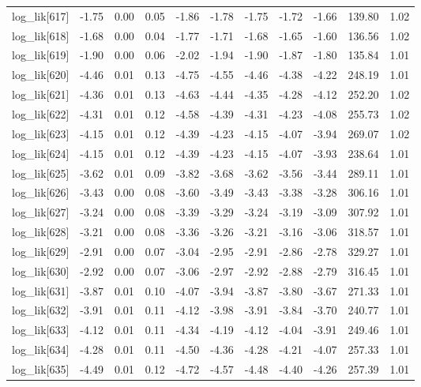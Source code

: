 \begin{table}[ht]
\begin{tabular}{rrrrrrrrrrr}
  log\_lik[617] & -1.75 & 0.00 & 0.05 & -1.86 & -1.78 & -1.75 & -1.72 & -1.66 & 139.80 & 1.02 \\ 
  log\_lik[618] & -1.68 & 0.00 & 0.04 & -1.77 & -1.71 & -1.68 & -1.65 & -1.60 & 136.56 & 1.02 \\ 
  log\_lik[619] & -1.90 & 0.00 & 0.06 & -2.02 & -1.94 & -1.90 & -1.87 & -1.80 & 135.84 & 1.01 \\ 
  log\_lik[620] & -4.46 & 0.01 & 0.13 & -4.75 & -4.55 & -4.46 & -4.38 & -4.22 & 248.19 & 1.01 \\ 
  log\_lik[621] & -4.36 & 0.01 & 0.13 & -4.63 & -4.44 & -4.35 & -4.28 & -4.12 & 252.20 & 1.02 \\ 
  log\_lik[622] & -4.31 & 0.01 & 0.12 & -4.58 & -4.39 & -4.31 & -4.23 & -4.08 & 255.73 & 1.02 \\ 
  log\_lik[623] & -4.15 & 0.01 & 0.12 & -4.39 & -4.23 & -4.15 & -4.07 & -3.94 & 269.07 & 1.02 \\ 
  log\_lik[624] & -4.15 & 0.01 & 0.12 & -4.39 & -4.23 & -4.15 & -4.07 & -3.93 & 238.64 & 1.01 \\ 
  log\_lik[625] & -3.62 & 0.01 & 0.09 & -3.82 & -3.68 & -3.62 & -3.56 & -3.44 & 289.11 & 1.01 \\ 
  log\_lik[626] & -3.43 & 0.00 & 0.08 & -3.60 & -3.49 & -3.43 & -3.38 & -3.28 & 306.16 & 1.01 \\ 
  log\_lik[627] & -3.24 & 0.00 & 0.08 & -3.39 & -3.29 & -3.24 & -3.19 & -3.09 & 307.92 & 1.01 \\ 
  log\_lik[628] & -3.21 & 0.00 & 0.08 & -3.36 & -3.26 & -3.21 & -3.16 & -3.06 & 318.57 & 1.01 \\ 
  log\_lik[629] & -2.91 & 0.00 & 0.07 & -3.04 & -2.95 & -2.91 & -2.86 & -2.78 & 329.27 & 1.01 \\ 
  log\_lik[630] & -2.92 & 0.00 & 0.07 & -3.06 & -2.97 & -2.92 & -2.88 & -2.79 & 316.45 & 1.01 \\ 
  log\_lik[631] & -3.87 & 0.01 & 0.10 & -4.07 & -3.94 & -3.87 & -3.80 & -3.67 & 271.33 & 1.01 \\ 
  log\_lik[632] & -3.91 & 0.01 & 0.11 & -4.12 & -3.98 & -3.91 & -3.84 & -3.70 & 240.77 & 1.01 \\ 
  log\_lik[633] & -4.12 & 0.01 & 0.11 & -4.34 & -4.19 & -4.12 & -4.04 & -3.91 & 249.46 & 1.01 \\ 
  log\_lik[634] & -4.28 & 0.01 & 0.11 & -4.50 & -4.36 & -4.28 & -4.21 & -4.07 & 257.33 & 1.01 \\ 
  log\_lik[635] & -4.49 & 0.01 & 0.12 & -4.72 & -4.57 & -4.48 & -4.40 & -4.26 & 257.39 & 1.01 \\ 

\end{tabular}
\end{table}
